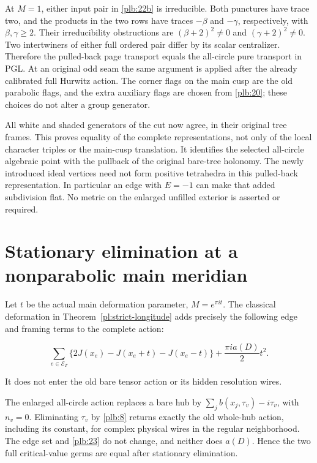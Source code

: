 At \(M=1\), either input pair in \eqref{plb:22b} is irreducible. Both punctures have trace two, and the products in the two rows have traces \(-\beta\) and \(-\gamma\), respectively, with \(\beta,\gamma\ge2\). Their irreducibility obstructions are \((\beta+2)^2\ne0\) and \((\gamma+2)^2\ne0\). Two intertwiners of either full ordered pair differ by its scalar centralizer. Therefore the pulled-back page transport equals the all-circle pure transport in PGL. At an original odd seam the same argument is applied after the already calibrated full Hurwitz action. The corner flags on the main cusp are the old parabolic flags, and the extra auxiliary flags are chosen from \eqref{plb:20}; these choices do not alter a group generator.

All white and shaded generators of the cut now agree, in their original tree frames. This proves equality of the complete representations, not only of the local character triples or the main-cusp translation. It identifies the selected all-circle algebraic point with the pullback of the original bare-tree holonomy. The newly introduced ideal vertices need not form positive tetrahedra in this pulled-back representation. In particular an edge with \(E=-1\) can make that added subdivision flat. No metric on the enlarged unfilled exterior is asserted or required.

\section{Stationary elimination at a nonparabolic main meridian}\label{plb:stationary-elimination-at-a-nonparabolic-main-meridian}

Let \(t\) be the actual main deformation parameter, \(M=e^{\pi it}\).
The classical deformation in Theorem~\ref{pl:strict-longitude}
adds precisely the following edge and framing terms to the complete action:

\begin{equation}\label{plb:23}
\sum_{e\in\mathcal E_T}
       \{2J(x_e)-J(x_e+t)-J(x_e-t)\}
       +\frac{\pi i a(D)}2t^2.
\end{equation}

It does not enter the old bare tensor action or its hidden resolution wires.

The enlarged all-circle action replaces a bare hub by
\(\sum_jb(x_j,\tau_v)-i\tau_v\), with \(n_v=0\).
Eliminating \(\tau_v\) by \eqref{plb:8} returns exactly the old whole-hub action, including its constant, for complex physical wires in the regular neighborhood. The edge set and \eqref{plb:23} do not change, and neither does \(a(D)\). Hence the two full critical-value germs are equal after stationary elimination.

